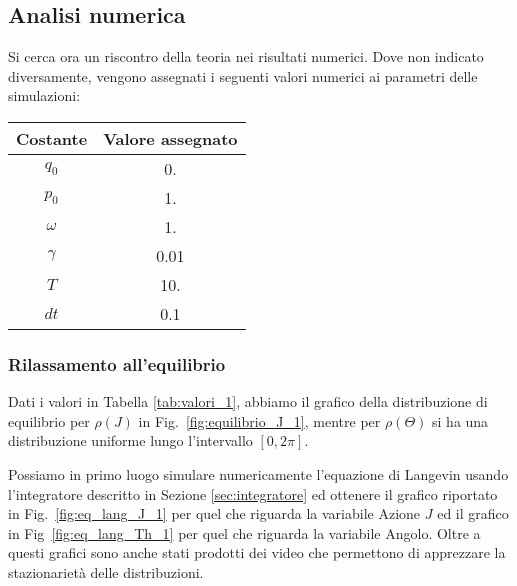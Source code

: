 \documentclass[10pt,a4paper]{article}
\begin{document}
\subsection{Analisi numerica}

Si cerca ora un riscontro della teoria nei risultati numerici. Dove non indicato diversamente, vengono assegnati i seguenti valori numerici ai parametri delle simulazioni:
\begin{center}
	\begin{tabular}{cS}
	\toprule
	Costante & {Valore assegnato} \\
	\midrule
	$q_0$		& 0.	\\
	$p_0$		& 1.	\\
	$\omega$	& 1.	\\
	$\gamma$	& 0.01	\\
	$T$			& 10.	\\
	$dt$		& 0.1	\\
	\bottomrule
	\end{tabular}
	\label{tab:valori_1}
\end{center}

\subsubsection{Rilassamento all'equilibrio}

Dati i valori in Tabella \ref{tab:valori_1}, abbiamo il grafico della distribuzione di equilibrio per $\rho(J)$ in Fig.~\ref{fig:equilibrio_J_1}, mentre per $\rho(\Theta)$ si ha una distribuzione uniforme lungo l'intervallo $[0,2\pi]$.

Possiamo in primo luogo simulare numericamente l'equazione di Langevin usando l'integratore descritto in Sezione \ref{sec:integratore} ed ottenere il grafico riportato in Fig.~\ref{fig:eq_lang_J_1} per quel che riguarda la variabile Azione $J$ ed il grafico in Fig~\ref{fig:eq_lang_Th_1} per quel che riguarda la variabile Angolo. Oltre a questi grafici sono anche stati prodotti dei video che permettono di apprezzare la stazionarietà delle distribuzioni.
\end{document}
